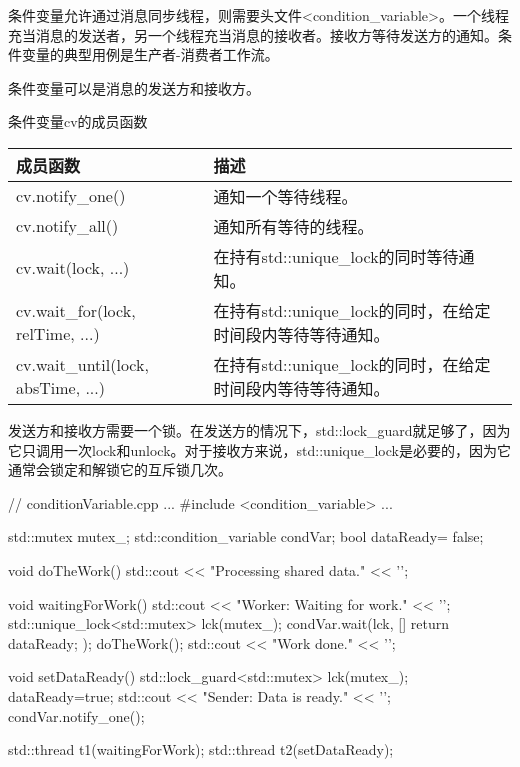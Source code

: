 条件变量允许通过消息同步线程，则需要头文件<condition\_variable>。一个线程充当消息的发送者，另一个线程充当消息的接收者。接收方等待发送方的通知。条件变量的典型用例是生产者-消费者工作流。

条件变量可以是消息的发送方和接收方。

\begin{center}
条件变量cv的成员函数
\end{center}

\begin{longtable}[c]{|l|l|}
\hline
\textbf{成员函数} & \textbf{描述}          \\ \hline
\endfirsthead
%
\endhead
%
cv.notify\_one()         & 通知一个等待线程。    \\ \hline
cv.notify\_all()         & 通知所有等待的线程。 \\ \hline
cv.wait(lock, ...)                 & 在持有std::unique\_lock的同时等待通知。                     \\ \hline
cv.wait\_for(lock, relTime, ...)   & 在持有std::unique\_lock的同时，在给定时间段内等待等待通知。 \\ \hline
cv.wait\_until(lock, absTime, ...) & 在持有std::unique\_lock的同时，在给定时间段内等待等待通知。        \\ \hline
\end{longtable}


发送方和接收方需要一个锁。在发送方的情况下，std::lock\_guard就足够了，因为它只调用一次lock和unlock。对于接收方来说，std::unique\_lock是必要的，因为它通常会锁定和解锁它的互斥锁几次。


\begin{cpp}
// conditionVariable.cpp
...
#include <condition_variable>
...

std::mutex mutex_;
std::condition_variable condVar;
bool dataReady= false;

void doTheWork(){
	std::cout << "Processing shared data." << '\n';
}

void waitingForWork(){
	std::cout << "Worker: Waiting for work." << '\n';
	std::unique_lock<std::mutex> lck(mutex_);
	condVar.wait(lck, []{ return dataReady; });
	doTheWork();
	std::cout << "Work done." << '\n';
}

void setDataReady(){
	std::lock_guard<std::mutex> lck(mutex_);
	dataReady=true;
	std::cout << "Sender: Data is ready." << '\n';
	condVar.notify_one();
}

std::thread t1(waitingForWork);
std::thread t2(setDataReady);
\end{cpp}

